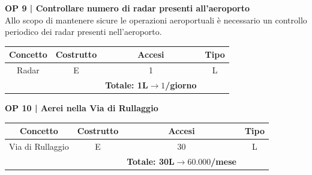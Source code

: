 \vspace{.6cm}


\textbf{\small OP 9 | Controllare numero di radar presenti all'aeroporto }\\

\textsf{\small Allo scopo di mantenere sicure le operazioni aeroportuali è necessario un controllo periodico dei radar presenti nell'aeroporto.}\break

\begin{tabular}{ c c c c} 
	\hline
	\rowcolor{airforceblue}
	\textbf{\color{white}Concetto} & \textbf{\color{white}Costrutto} & \textbf{\color{white}Accesi} & \textbf{\color{white}Tipo}\\
	\hline
	\textsf{\small Radar} & \textsf{\small E} & \textsf{\small 1} &  \textsf{\small L}\\
	\hline
	\rowcolor{airforceblue}
	\textsf{\small } & \textsf{\small } & \textbf{\color{white}Totale: 1L$\rightarrow 1$/giorno } \textsf{\small } & \textsf{\small }\\
	\hline
\end{tabular}

\vspace{.6cm}


\textbf{\small OP 10 | Aerei nella Via di Rullaggio}\\

\begin{tabular}{ c c c c} 
	\hline
	\rowcolor{airforceblue}
	\textbf{\color{white}Concetto} & \textbf{\color{white}Costrutto} & \textbf{\color{white}Accesi} & \textbf{\color{white}Tipo}\\
	\hline
	\textsf{\small Via di Rullaggio} & \textsf{\small E} & \textsf{\small 30} &  \textsf{\small L}\\
	\hline
	\rowcolor{airforceblue}
	\textsf{\small } & \textsf{\small } & \textbf{\color{white}Totale: 30L$\rightarrow 60.000$/mese } \textsf{\small } & \textsf{\small }\\
	\hline
\end{tabular}

\vspace{.6cm}

\pagebreak


